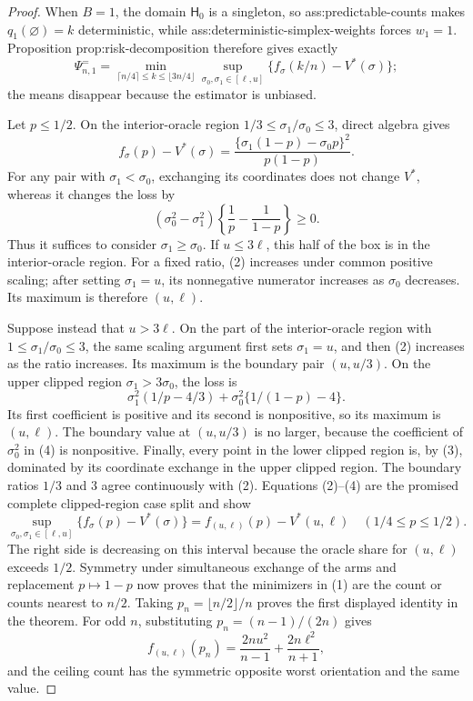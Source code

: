 \documentclass{article}
\begin{document}
\begin{proof}
When \(B=1\), the domain \(\mathsf H_0\) is a singleton, so ass:predictable-counts makes \(q_1(\varnothing)=k\) deterministic, while ass:deterministic-simplex-weights forces \(w_1=1\).  Proposition prop:risk-decomposition therefore gives exactly
\[
\Psi^=_{n,1}=\min_{\lceil n/4\rceil\leq k\leq\lfloor3n/4\rfloor}
 \sup_{\sigma_0,\sigma_1\in[\ell,u]}
 \{f_\sigma(k/n)-V^*(\sigma)\};                            \tag{1}
\]
the means disappear because the estimator is unbiased.

Let \(p\leq1/2\).  On the interior-oracle region
\(1/3\leq\sigma_1/\sigma_0\leq3\), direct algebra gives
\[
f_\sigma(p)-V^*(\sigma)
=\frac{\{\sigma_1(1-p)-\sigma_0p\}^2}{p(1-p)}.              \tag{2}
\]
For any pair with \(\sigma_1<\sigma_0\), exchanging its coordinates does not change
\(V^*\), whereas it changes the loss by
\[
(\sigma_0^2-\sigma_1^2)
\left\{\frac1p-\frac1{1-p}\right\}\geq0.                   \tag{3}
\]
Thus it suffices to consider \(\sigma_1\geq\sigma_0\).  If \(u\leq3\ell\), this half of the box is in the interior-oracle region.  For a fixed ratio, (2) increases under common positive scaling; after setting \(\sigma_1=u\), its nonnegative numerator increases as \(\sigma_0\) decreases.  Its maximum is therefore \((u,\ell)\).

Suppose instead that \(u>3\ell\).  On the part of the interior-oracle region with
\(1\leq\sigma_1/\sigma_0\leq3\), the same scaling argument first sets
\(\sigma_1=u\), and then (2) increases as the ratio increases.  Its maximum is the boundary pair \((u,u/3)\).  On the upper clipped region \(\sigma_1>3\sigma_0\), the loss is
\[
\sigma_1^2(1/p-4/3)+\sigma_0^2\{1/(1-p)-4\}.               \tag{4}
\]
Its first coefficient is positive and its second is nonpositive, so its maximum is
\((u,\ell)\).  The boundary value at \((u,u/3)\) is no larger, because the coefficient of \(\sigma_0^2\) in (4) is nonpositive.  Finally, every point in the lower clipped region is, by (3), dominated by its coordinate exchange in the upper clipped region.  The boundary ratios \(1/3\) and \(3\) agree continuously with (2).  Equations (2)--(4) are the promised complete clipped-region case split and show
\[
\sup_{\sigma_0,\sigma_1\in[\ell,u]}
 \{f_\sigma(p)-V^*(\sigma)\}=f_{(u,\ell)}(p)-V^*(u,\ell)
\quad(1/4\leq p\leq1/2).                                   \tag{5}
\]
The right side is decreasing on this interval because the oracle share for \((u,\ell)\) exceeds \(1/2\).  Symmetry under simultaneous exchange of the arms and replacement \(p\mapsto1-p\) now proves that the minimizers in (1) are the count or counts nearest to \(n/2\).  Taking \(p_n=\lfloor n/2\rfloor/n\) proves the first displayed identity in the theorem.  For odd \(n\), substituting
\(p_n=(n-1)/(2n)\) gives
\[
f_{(u,\ell)}(p_n)=\frac{2nu^2}{n-1}+\frac{2n\ell^2}{n+1},
\]
and the ceiling count has the symmetric opposite worst orientation and the same value.


\end{proof}
\end{document}

